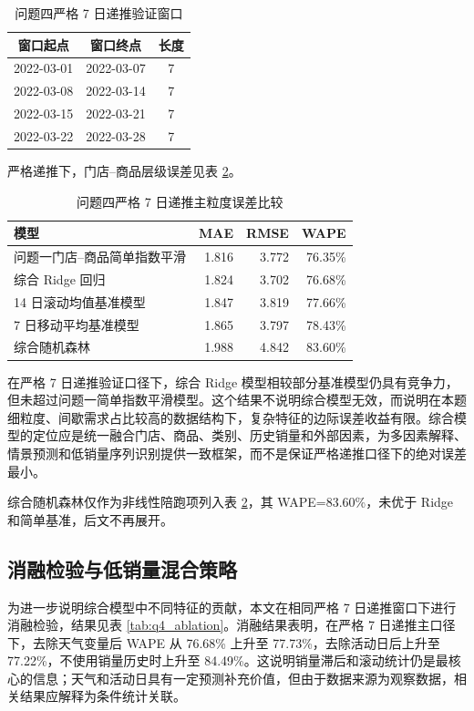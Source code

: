 \begin{table}[H]
\centering
\caption{问题四严格 7 日递推验证窗口}
\label{tab:q4_windows}
\begin{tabular}{ccc}
\toprule
窗口起点 & 窗口终点 & 长度 \\
\midrule
2022-03-01 & 2022-03-07 & 7 \\
2022-03-08 & 2022-03-14 & 7 \\
2022-03-15 & 2022-03-21 & 7 \\
2022-03-22 & 2022-03-28 & 7 \\
\bottomrule
\end{tabular}
\end{table}

严格递推下，门店--商品层级误差见表 \ref{tab:q4_metrics}。

\begin{table}[H]
\centering
\caption{问题四严格 7 日递推主粒度误差比较}
\label{tab:q4_metrics}
\begin{tabular}{lrrr}
\toprule
模型 & MAE & RMSE & WAPE \\
\midrule
问题一门店--商品简单指数平滑 & 1.816 & 3.772 & 76.35\% \\
综合 Ridge 回归 & 1.824 & 3.702 & 76.68\% \\
14 日滚动均值基准模型 & 1.847 & 3.819 & 77.66\% \\
7 日移动平均基准模型 & 1.865 & 3.797 & 78.43\% \\
综合随机森林 & 1.988 & 4.842 & 83.60\% \\
\bottomrule
\end{tabular}
\end{table}

在严格 7 日递推验证口径下，综合 Ridge 模型相较部分基准模型仍具有竞争力，但未超过问题一简单指数平滑模型。这个结果不说明综合模型无效，而说明在本题细粒度、间歇需求占比较高的数据结构下，复杂特征的边际误差收益有限。综合模型的定位应是统一融合门店、商品、类别、历史销量和外部因素，为多因素解释、情景预测和低销量序列识别提供一致框架，而不是保证严格递推口径下的绝对误差最小。

综合随机森林仅作为非线性陪跑项列入表 \ref{tab:q4_metrics}，其 WAPE=83.60\%，未优于 Ridge 和简单基准，后文不再展开。

\subsection{消融检验与低销量混合策略}

为进一步说明综合模型中不同特征的贡献，本文在相同严格 7 日递推窗口下进行消融检验，结果见表 \ref{tab:q4_ablation}。消融结果表明，在严格 7 日递推主口径下，去除天气变量后 WAPE 从 76.68\% 上升至 77.73\%，去除活动日后上升至 77.22\%，不使用销量历史时上升至 84.49\%。这说明销量滞后和滚动统计仍是最核心的信息；天气和活动日具有一定预测补充价值，但由于数据来源为观察数据，相关结果应解释为条件统计关联。

